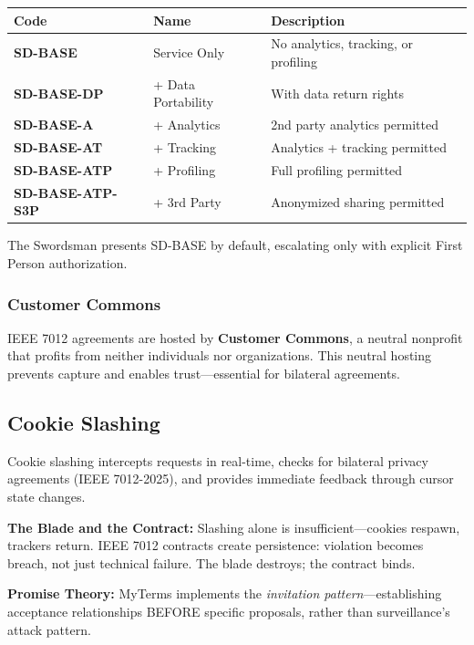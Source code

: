 \documentclass[
]{article}
\newcounter{none} %
\begin{document}
{\def\LTcaptype{none} %
\begin{longtable}[]{@{}lll@{}}
\toprule\noalign{}
Code & Name & Description \\
\midrule\noalign{}
\endhead
\bottomrule\noalign{}
\endlastfoot
\textbf{SD-BASE} & Service Only & No analytics, tracking, or
profiling \\
\textbf{SD-BASE-DP} & + Data Portability & With data return rights \\
\textbf{SD-BASE-A} & + Analytics & 2nd party analytics permitted \\
\textbf{SD-BASE-AT} & + Tracking & Analytics + tracking permitted \\
\textbf{SD-BASE-ATP} & + Profiling & Full profiling permitted \\
\textbf{SD-BASE-ATP-S3P} & + 3rd Party & Anonymized sharing permitted \\
\end{longtable}
}

The Swordsman presents SD-BASE by default, escalating only with explicit
First Person authorization.

\subsubsection{Customer Commons}\label{customer-commons}

IEEE 7012 agreements are hosted by \textbf{Customer Commons}, a neutral
nonprofit that profits from neither individuals nor organizations. This
neutral hosting prevents capture and enables trust---essential for
bilateral agreements.

\subsection{Cookie Slashing}\label{cookie-slashing}

Cookie slashing intercepts requests in real-time, checks for bilateral
privacy agreements (IEEE 7012-2025), and provides immediate feedback
through cursor state changes.

\textbf{The Blade and the Contract:} Slashing alone is
insufficient---cookies respawn, trackers return. IEEE 7012 contracts
create persistence: violation becomes breach, not just technical
failure. The blade destroys; the contract binds.

\textbf{Promise Theory:} MyTerms implements the \emph{invitation
pattern}---establishing acceptance relationships BEFORE specific
proposals, rather than surveillance's attack pattern.
\end{document}
